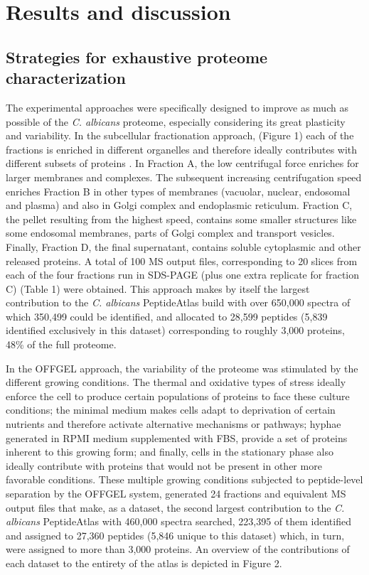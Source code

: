 \section*{Results and discussion}


\subsection*{Strategies for exhaustive proteome characterization}

The experimental approaches were specifically designed to improve as much as possible of
the \textit{C. albicans} proteome, especially considering its great plasticity and variability.
In the subcellular fractionation approach, (Figure 1) each of the fractions is enriched in
different organelles and therefore ideally contributes with different subsets of proteins \citep{Harford2001}.
In Fraction A, the low centrifugal force enriches for larger membranes and complexes. The
subsequent increasing centrifugation speed enriches Fraction B in other types of membranes
(vacuolar, nuclear, endosomal and plasma) and also in Golgi complex and endoplasmic
reticulum. Fraction C, the pellet resulting from the highest speed, contains some smaller
structures like some endosomal membranes, parts of Golgi complex and transport vesicles.
Finally, Fraction D, the final supernatant, contains soluble cytoplasmic and other released
proteins. A total of 100 MS output files, corresponding to 20 slices from each of the four
fractions run in SDS-PAGE (plus one extra replicate for fraction C) (Table 1) were obtained.
This approach makes by itself the largest contribution to the \textit{C. albicans} PeptideAtlas build
with over 650,000 spectra of which 350,499 could be identified, and allocated to 28,599
peptides (5,839 identified exclusively in this dataset) corresponding to roughly 3,000
proteins, 48\% of the full proteome.

In the OFFGEL approach, the variability of the proteome was stimulated by the different
growing conditions. The thermal and oxidative types of stress ideally enforce the cell to
produce certain populations of proteins to face these culture conditions; the minimal medium
makes cells adapt to deprivation of certain nutrients and therefore activate alternative
mechanisms or pathways; hyphae generated in RPMI medium supplemented with FBS,
provide a set of proteins inherent to this growing form; and finally, cells in the stationary
phase also ideally contribute with proteins that would not be present in other more favorable
conditions. These multiple growing conditions subjected to peptide-level separation by the
OFFGEL system, generated 24 fractions and equivalent MS output files that make, as a
dataset, the second largest contribution to the \textit{C. albicans} PeptideAtlas with 460,000 spectra
searched, 223,395 of them identified and assigned to 27,360 peptides (5,846 unique to this
dataset) which, in turn, were assigned to more than 3,000 proteins. An overview of the
contributions of each dataset to the entirety of the atlas is depicted in Figure 2.


